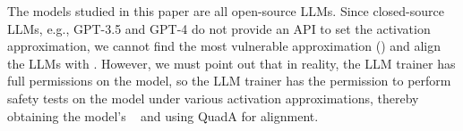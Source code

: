 The models studied in this paper are all open-source LLMs. Since closed-source LLMs, e.g., GPT-3.5 and GPT-4 do not provide an API to set the activation approximation, we cannot find the most vulnerable approximation (\mva) and align the LLMs with \mva. However, we must point out that in reality, the LLM trainer has full permissions on the model, so the LLM trainer has the permission to perform safety tests on the model under various activation approximations, thereby obtaining the model's \mva~ and using QuadA for alignment.

